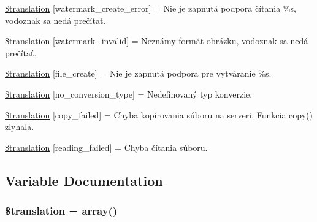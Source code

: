 \begin{DoxyCompactItemize}
\item 
\hyperlink{class_8upload_8sk___s_k_8php_aabca0b65dadbc6184415c16375f284ca}{\$translation} \mbox{[}\textquotesingle{}watermark\+\_\+create\+\_\+error\textquotesingle{}\mbox{]} = \textquotesingle{}Nie je zapnutá podpora čítania \%s, vodoznak sa nedá prečítať.\textquotesingle{}
\item 
\hyperlink{class_8upload_8sk___s_k_8php_ac336e7a5701e47ba4a05e9e498a3cc44}{\$translation} \mbox{[}\textquotesingle{}watermark\+\_\+invalid\textquotesingle{}\mbox{]} = \textquotesingle{}Neznámy formát obrázku, vodoznak sa nedá prečítať.\textquotesingle{}
\item 
\hyperlink{class_8upload_8sk___s_k_8php_a1ecb4673e4fb69e06b3f20b65cecf30a}{\$translation} \mbox{[}\textquotesingle{}file\+\_\+create\textquotesingle{}\mbox{]} = \textquotesingle{}Nie je zapnutá podpora pre vytváranie \%s.\textquotesingle{}
\item 
\hyperlink{class_8upload_8sk___s_k_8php_a4712d7ec28e9a7f17eb3338af2358363}{\$translation} \mbox{[}\textquotesingle{}no\+\_\+conversion\+\_\+type\textquotesingle{}\mbox{]} = \textquotesingle{}Nedefinovaný typ konverzie.\textquotesingle{}
\item 
\hyperlink{class_8upload_8sk___s_k_8php_a783c9358bcf54a054545b50098bc679b}{\$translation} \mbox{[}\textquotesingle{}copy\+\_\+failed\textquotesingle{}\mbox{]} = \textquotesingle{}Chyba kopírovania súboru na serveri. Funkcia copy() zlyhala.\textquotesingle{}
\item 
\hyperlink{class_8upload_8sk___s_k_8php_a01bea14c9fd5f353f62db44beabfcd42}{\$translation} \mbox{[}\textquotesingle{}reading\+\_\+failed\textquotesingle{}\mbox{]} = \textquotesingle{}Chyba čítania súboru.\textquotesingle{}
\end{DoxyCompactItemize}


\subsection{Variable Documentation}
\hypertarget{class_8upload_8sk___s_k_8php_a1f198d410fecc3871ebdd468d343a5e3}{}
\subsubsection[{\$translation}]{\setlength{\rightskip}{0pt plus 5cm}\$translation = array()}\label{class_8upload_8sk___s_k_8php_a1f198d410fecc3871ebdd468d343a5e3}
\hypertarget{class_8upload_8sk___s_k_8php_ac7498e49b9771b04698029aa61c70821}{}
